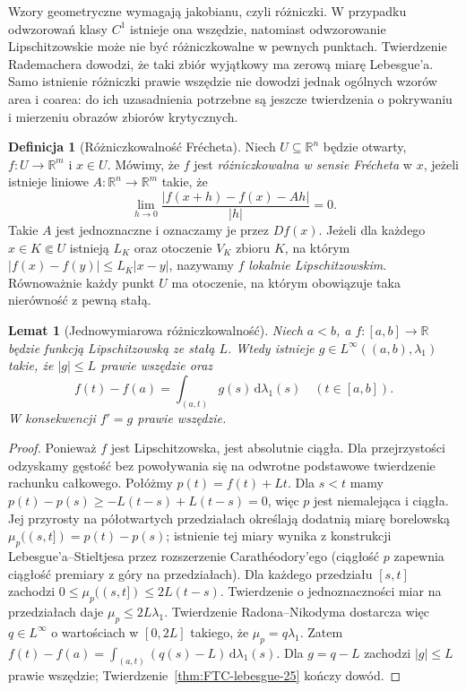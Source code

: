 \documentclass[11pt,a4paper,oneside]{book}
\numberwithin{equation}{chapter}
\theoremstyle{plain}
\newtheorem{lemat}[twierdzenie]{Lemat}
\theoremstyle{definition}
\newtheorem{definicja}[twierdzenie]{Definicja}
\theoremstyle{remark}
\begin{document}
Wzory geometryczne wymagają jakobianu, czyli różniczki. W przypadku
odwzorowań klasy $C^1$ istnieje ona wszędzie, natomiast odwzorowanie
Lipschitzowskie może nie być różniczkowalne w pewnych punktach.
Twierdzenie Rademachera dowodzi, że taki zbiór wyjątkowy ma zerową
miarę Lebesgue'a. Samo istnienie różniczki prawie wszędzie nie dowodzi
jednak ogólnych wzorów area i coarea: do ich uzasadnienia potrzebne są
jeszcze twierdzenia o pokrywaniu i mierzeniu obrazów zbiorów krytycznych.

\begin{definicja}[Różniczkowalność Frécheta]
\label{def:frechet-rademacher-28}
Niech $U\subseteq\mathbb R^n$ będzie otwarty,
$f:U\to\mathbb R^m$ i $x\in U$. Mówimy, że $f$ jest
\emph{różniczkowalna w sensie Frécheta} w $x$, jeżeli istnieje
liniowe $A:\mathbb R^n\to\mathbb R^m$ takie, że
\[
 \lim_{h\to0}\frac{|f(x+h)-f(x)-Ah|}{|h|}=0.
\]
Takie $A$ jest jednoznaczne i oznaczamy je przez $Df(x)$.
Jeżeli dla każdego $x\in K\Subset U$ istnieją $L_K$ oraz
otoczenie $V_K$ zbioru $K$, na którym
$|f(x)-f(y)|\le L_K|x-y|$, nazywamy $f$
\emph{lokalnie Lipschitzowskim}. Równoważnie każdy punkt
$U$ ma otoczenie, na którym obowiązuje taka nierówność
z pewną stałą.
\end{definicja}

\begin{lemat}[Jednowymiarowa różniczkowalność]
\label{lem:rademacher-line-28}
Niech $a<b$, a $f:[a,b]\to\mathbb R$ będzie funkcją
Lipschitzowską ze stałą $L$. Wtedy istnieje
$g\in L^\infty((a,b),\lambda_1)$ takie, że
$|g|\le L$ prawie wszędzie oraz
\[
 f(t)-f(a)=\int_{(a,t)}g(s)\,\mathrm d\lambda_1(s)
 \quad (t\in[a,b]).
\]
W konsekwencji $f'=g$ prawie wszędzie.
\end{lemat}
\begin{proof}
Ponieważ $f$ jest Lipschitzowska, jest absolutnie ciągła.
Dla przejrzystości odzyskamy gęstość bez powoływania się na
odwrotne podstawowe twierdzenie rachunku całkowego.
Połóżmy $p(t)=f(t)+Lt$. Dla $s<t$ mamy
$p(t)-p(s)\ge -L(t-s)+L(t-s)=0$, więc $p$ jest
niemalejąca i ciągła. Jej przyrosty na półotwartych
przedziałach określają dodatnią miarę borelowską
$\mu_p((s,t])=p(t)-p(s)$; istnienie tej miary wynika
z konstrukcji Lebesgue'a--Stieltjesa przez rozszerzenie
Carathéodory'ego (ciągłość $p$ zapewnia ciągłość
premiary z góry na przedziałach). Dla każdego przedziału
$[s,t]$ zachodzi
$0\le\mu_p((s,t])\le2L(t-s)$.
Twierdzenie o jednoznaczności miar na przedziałach daje
$\mu_p\le2L\lambda_1$. Twierdzenie Radona--Nikodyma
dostarcza więc $q\in L^\infty$ o wartościach w $[0,2L]$
takiego, że $\mu_p=q\lambda_1$. Zatem
$f(t)-f(a)=\int_{(a,t)}(q(s)-L)\,\mathrm d\lambda_1(s)$.
Dla $g=q-L$ zachodzi $|g|\le L$ prawie wszędzie;
Twierdzenie~\ref{thm:FTC-lebesgue-25} kończy dowód.
\end{proof}
\end{document}
